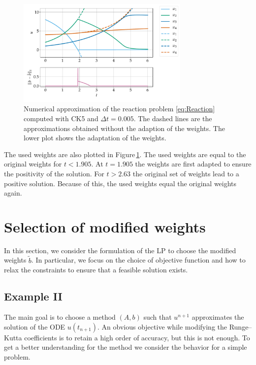 \documentclass[a4paper]{article}
\numberwithin{equation}{section}
\theoremstyle{plain}
\theoremstyle{definition}
\numberwithin{theorem}{section}
\newcommand{\dt}{{\Delta t}}
\newcommand{\1}{\mathbbm{1}}
\newcommand{\bt}{\tilde{b}}
\begin{document}
\begin{figure}[ht]
    \centering
    \includegraphics[width=0.75\textwidth]{plots/exampleI.pdf}
    \caption{Numerical approximation of the reaction problem \eqref{eq:Reaction} computed with CK5 and $\dt = 0.005$. The dashed lines are the approximations obtained without the adaption of the weights. The lower plot shows the adaptation of the weights. }
    \label{fig:exampleI}
\end{figure}

The used weights are also plotted in Figure\,\ref{fig:exampleI}.
The used weights are equal to the original weights for $t<1.905$. At $t=1.905$ the weights are first adapted to ensure the positivity of the solution. For $t>2.63$ the original set of weights lead to a positive solution. Because of this, the used weights equal the original weights again.


\section{Selection of modified weights}\label{sec:LP}

In this section, we consider the formulation of the LP to choose
the modified weights $\bt$.  In particular, we focus on the choice
of objective function and how to relax the constraints to ensure that
a feasible solution exists.

\subsection{Example II}\label{sec:example_lin}

The main goal is to choose a method $(A,b)$ such that $u^{n+1}$
approximates the solution of the ODE $u(t_{n+1})$.
An obvious objective while modifying the Runge--Kutta coefficients
is to retain a high order of accuracy, but this is not enough.
To get a better understanding for the method we consider the
behavior for a simple problem.
\end{document}

